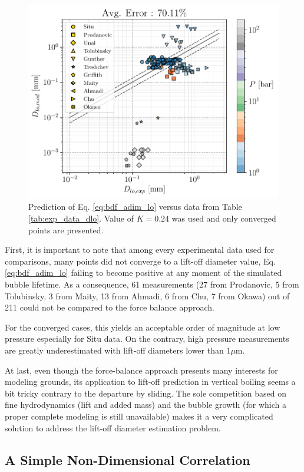 \begin{figure}[!h]
\centering
\includegraphics[width=0.75\linewidth]{img/bub_dyn/lift-off/pred_bdf.pdf}
\caption{Prediction of Eq. \ref{eq:bdf_adim_lo} versus data from Table \ref{tab:exp_data_dlo}. Value of $K=0.24$ was used and only converged points are presented.}
\label{fig:pred_bdf_dlo}
\end{figure}
\npar

First, it is important to note that among every experimental data used for comparisons, many points did not converge to a lift-off diameter value, Eq. \ref{eq:bdf_adim_lo} failing to become positive at any moment of the simulated bubble lifetime. As a consequence, 61 measurements (27 from Prodanovic, 5 from Tolubinsky, 3 from Maity, 13 from Ahmadi, 6 from Chu, 7 from Okawa) out of 211 could not be compared to the force balance approach.

For the converged cases, this yields an acceptable order of magnitude at low pressure especially for Situ data. On the contrary, high pressure measurements are greatly underestimated with lift-off diameters lower than 1$\mu$m.

\npar

At last, even though the force-balance approach presents many interests for modeling grounds, its application to lift-off prediction in vertical boiling seems a bit tricky contrary to the departure by sliding. The sole competition based on fine hydrodynamics (lift and added mass) and the bubble growth (for which a proper complete modeling is still unavailable) makes it a very complicated solution to address the lift-off diameter estimation problem. 


\subsection{A Simple Non-Dimensional Correlation}


